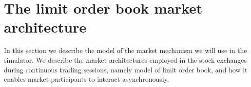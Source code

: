 \section{The limit order book market architecture}
\label{Chapters/Background/Market-Architecture}

In this section we describe the model of the market mechanism we will use in the simulator. We describe the market architectures employed in the stock exchanges during continuous trading sessions, namely model of limit order book, and how it enables market participants to interact asynchronously. 

\subsection{}
